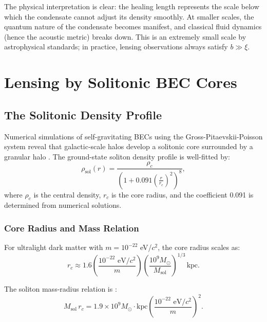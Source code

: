 \documentclass[11pt,a4paper]{article}
\newcommand{\Msun}{\ensuremath{M_\odot}}
\newcommand{\kpc}{\ensuremath{\mathrm{kpc}}}
\theoremstyle{definition}
\theoremstyle{remark}
\begin{document}
The physical interpretation is clear: the healing length represents the scale below which the condensate cannot adjust its density smoothly. At smaller scales, the quantum nature of the condensate becomes manifest, and classical fluid dynamics (hence the acoustic metric) breaks down. This is an extremely small scale by astrophysical standards; in practice, lensing observations always satisfy $b \gg \xi$.

\section{Lensing by Solitonic BEC Cores}
\label{sec:solitonic_lensing}

\subsection{The Solitonic Density Profile}
\label{sec:solitonic_profile}

Numerical simulations of self-gravitating BECs using the Gross-Pitaevskii-Poisson system reveal that galactic-scale halos develop a solitonic core surrounded by a granular halo \cite{Schive2014}. The ground-state soliton density profile is well-fitted by:
\begin{equation}
\label{eq:soliton_profile}
\rho_{\mathrm{sol}}(r) = \frac{\rho_c}{\left(1 + 0.091 \left(\frac{r}{r_c}\right)^2\right)^8},
\end{equation}
where $\rho_c$ is the central density, $r_c$ is the core radius, and the coefficient 0.091 is determined from numerical solutions.

\subsubsection{Core Radius and Mass Relation}

For ultralight dark matter with $m = 10^{-22}$ eV/$c^2$, the core radius scales as:
\begin{equation}
\label{eq:core_radius}
r_c \approx 1.6 \left(\frac{10^{-22} \text{ eV}/c^2}{m}\right) \left(\frac{10^9 \Msun}{M_{\mathrm{sol}}}\right)^{1/3} \, \kpc.
\end{equation}

The soliton mass-radius relation is \cite{Marsh2015}:
\begin{equation}
\label{eq:mass_radius_relation}
M_{\mathrm{sol}} \, r_c = 1.9 \times 10^9 \Msun \cdot \kpc \left(\frac{10^{-22} \text{ eV}/c^2}{m}\right)^2.
\end{equation}
\end{document}
